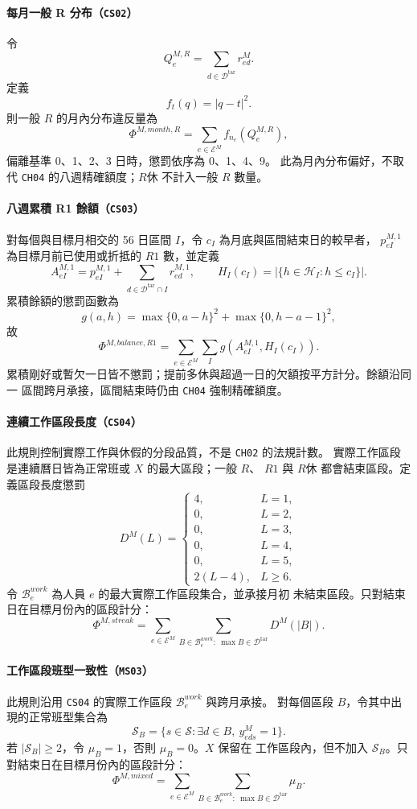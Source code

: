 \documentclass[a4paper,12pt]{article}
\begin{document}
\paragraph{每月一般 R 分布（\texttt{CS02}）}
令
\[
  Q^{M,R}_e=\sum_{d\in\mathcal{D}^{\mathrm{tar}}}r^{M}_{ed}.
\]
定義
\[
  f_t(q)=|q-t|^2.
\]
則一般 \(R\) 的月內分布違反量為
\[
  \Phi^{M,month,R}
  =
  \sum_{e\in\mathcal{E}^{M}}f_{n_e}\!\left(Q^{M,R}_e\right),
\]
偏離基準 0、1、2、3 日時，懲罰依序為 0、1、4、9。
此為月內分布偏好，不取代 \texttt{CH04} 的八週精確額度；\(R休\) 不計入一般 \(R\) 數量。

\paragraph{八週累積 R1 餘額（\texttt{CS03}）}
對每個與目標月相交的 56 日區間 \(I\)，令 \(c_I\) 為月底與區間結束日的較早者，
\(p^{M,1}_{eI}\) 為目標月前已使用或折抵的 \(R1\) 數，並定義
\[
  A^{M,1}_{eI}=p^{M,1}_{eI}
  +\sum_{d\in\mathcal D^{\mathrm{tar}}\cap I}r^{M,1}_{ed},
  \qquad
  H_I(c_I)=|\{h\in\mathcal H_I:h\le c_I\}|.
\]
累積餘額的懲罰函數為
\[
  g(a,h)=\max\{0,a-h\}^2+\max\{0,h-a-1\}^2,
\]
故
\[
  \Phi^{M,balance,R1}=\sum_{e\in\mathcal E^M}\sum_{I}g(A^{M,1}_{eI},H_I(c_I)).
\]
累積剛好或暫欠一日皆不懲罰；提前多休與超過一日的欠額按平方計分。餘額沿同一
區間跨月承接，區間結束時仍由 \texttt{CH04} 強制精確額度。

\paragraph{連續工作區段長度（\texttt{CS04}）}
此規則控制實際工作與休假的分段品質，不是 \texttt{CH02} 的法規計數。
實際工作區段是連續曆日皆為正常班或 \(X\) 的最大區段；一般 \(R\)、
\(R1\) 與 \(R休\) 都會結束區段。定義區段長度懲罰
\[
  D^M(L)
  =
  \begin{cases}
    4, & L=1,\\
    0, & L=2,\\
    0, & L=3,\\
    0, & L=4,\\
    0, & L=5,\\
    2(L-4), & L\geq6.
  \end{cases}
\]
令 \(\mathcal{B}^{work}_e\) 為人員 \(e\) 的最大實際工作區段集合，並承接月初
未結束區段。只對結束日在目標月份內的區段計分：
\[
  \Phi^{M,streak}
  =
  \sum_{e\in\mathcal{E}^{M}}
  \sum_{B\in\mathcal{B}^{work}_e:\ \max B\in\mathcal{D}^{\mathrm{tar}}}
  D^M(|B|).
\]

\paragraph{工作區段班型一致性（\texttt{MS03}）}
此規則沿用 \texttt{CS04} 的實際工作區段 \(\mathcal{B}^{work}_e\) 與跨月承接。
對每個區段 \(B\)，令其中出現的正常班型集合為
\[
  \mathcal S_B
  =\{s\in\mathcal S:\exists d\in B,\ y^M_{eds}=1\}.
\]
若 \(|\mathcal S_B|\geq2\)，令 \(\mu_B=1\)，否則 \(\mu_B=0\)。\(X\) 保留在
工作區段內，但不加入 \(\mathcal S_B\)。只對結束日在目標月份內的區段計分：
\[
  \Phi^{M,mixed}
  =\sum_{e\in\mathcal E^M}
  \sum_{B\in\mathcal B^{work}_e:\ \max B\in\mathcal D^{\mathrm{tar}}}\mu_B.
\]
\end{document}
